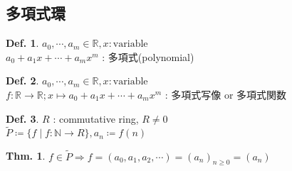 \documentclass[uplatex,dvipdfmx,9pt]{beamer}
\newcommand{\R}{\mathbb{R}}
\newcommand{\N}{\mathbb{N}}
\newcommand{\sscount}{\textsection \thesubsection}
\newcounter{textExmCount}
\theoremstyle{definition} %
\newtheorem{defn}{Def.}[subsection] %
\newtheorem{thm}{Thm.}[subsection] %
\theoremstyle{example}
\begin{document}
    \subsection{\sscount 多項式環}
    \setcounter{textExmCount}{0}

    \begin{frame}

      \begin{defn}
        $a_0, \cdots, a_m \in \R, x : \text{variable}$ \\
        $a_0 + a_1 x + \cdots + a_m x^m$ : 多項式(polynomial)
      \end{defn}

      \begin{defn}
        $a_0, \cdots, a_m \in \R, x : \text{variable}$ \\
        $f\colon \R \to \R; x \mapsto a_0 + a_1 x + \cdots + a_m x^m$ : \alert{多項式写像} or \alert{多項式関数}
      \end{defn}

      \begin{defn}
        $R$ : commutative ring, $R \neq 0$ \\
        $\tilde{P} \coloneqq \{f \mid f\colon \N \to R\}, a_n \coloneqq f(n)$
      \end{defn}

      \begin{thm}
        $f \in \tilde{P} \Rightarrow f = (a_0, a_1, a_2, \cdots) = (a_n)_{n \ge 0} = (a_n)$
      \end{thm}
     
    \end{frame}
\end{document}
